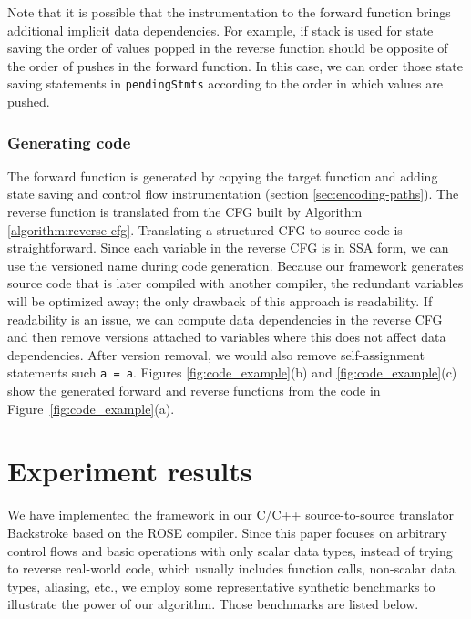 Note that it is possible that the instrumentation to the forward function brings additional implicit data dependencies. 
For example, if stack is used for state saving the order of values popped in the reverse function should be opposite of the order of pushes in the forward function. 
In this case, we can order those state saving statements in \texttt{pendingStmts} according to the order in which values are pushed.


\subsubsection{Generating code} 
The forward function is generated by copying the target function and adding state saving and control flow instrumentation (section \ref{sec:encoding-paths}). 
The reverse function is translated from the CFG built by Algorithm \ref{algorithm:reverse-cfg}. 
Translating a structured CFG to source code is straightforward. 
Since each variable in the reverse CFG is in SSA form, we can use the versioned name during code generation. 
Because our framework generates source code that is later compiled with another compiler, the redundant variables will be optimized away; the only drawback of this approach is readability.
If readability is an issue, we can compute data dependencies in the reverse CFG and then remove versions attached to variables where this does not affect data dependencies.
After version removal, we would also remove self-assignment statements such \texttt{a = a}.
Figures \ref{fig:code_example}(b) and \ref{fig:code_example}(c) show the generated forward and reverse functions from the code in Figure~\ref{fig:code_example}(a).



\section{Experiment results}

We have implemented the framework in our C/C++ source-to-source translator Backstroke based on the ROSE compiler. 
Since this paper focuses on arbitrary control flows and basic operations with only scalar data types, instead of trying to reverse real-world code, which usually includes function calls, non-scalar data types, aliasing, etc., we employ some representative synthetic benchmarks to illustrate the power of our algorithm. Those benchmarks are listed below.

\newcommand{\NoBranch}{\textbf{NoBranch}\xspace}
\newcommand{\Branchesa}{\textbf{Branches1}\xspace}
\newcommand{\Branchesb}{\textbf{Branches2}\xspace}
\newcommand{\Branchesc}{\textbf{Branches3}\xspace}
\newcommand{\Loopa}{\textbf{Loop1}\xspace}
\newcommand{\Loopb}{\textbf{Loop2}\xspace}
\newcommand{\Asn}{\textbf{Assignment}\xspace}
\newcommand{\Inc}{\textbf{Increment}\xspace}
\newcommand{\CSS}{\textbf{CSS}\xspace}
\newcommand{\ISS}{\textbf{ISS}\xspace}
\newcommand{\RCC}{\textbf{RCC}\xspace}

